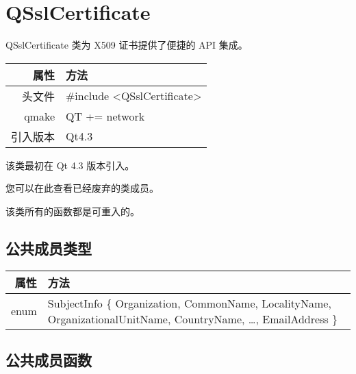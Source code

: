 \chapter{QSslCertificate}

QSslCertificate 类为 X509 证书提供了便捷的 API 集成。

\begin{tabular}{|r|l|}
	\hline
	属性 & 方法 \\
	\hline
	头文件 & \#include <QSslCertificate>\\      
	\hline
	qmake & QT += network\\      
	\hline
	引入版本 &	Qt4.3 \\ 
	\hline
\end{tabular}

该类最初在 Qt 4.3 版本引入。

您可以在此查看已经废弃的类成员。

\begin{notice}
该类所有的函数都是可重入的。
\end{notice}

\section{公共成员类型}

\begin{tabular}{|r|m{27em}|}
\hline 
属性 	&方法 \\ 
\hline
enum &	SubjectInfo \{ Organization, CommonName, LocalityName, OrganizationalUnitName, CountryName, …, EmailAddress \}\\
\hline
\end{tabular}

\section{公共成员函数}


